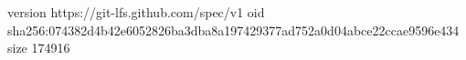 version https://git-lfs.github.com/spec/v1
oid sha256:074382d4b42e6052826ba3dba8a197429377ad752a0d04abce22ccae9596e434
size 174916
